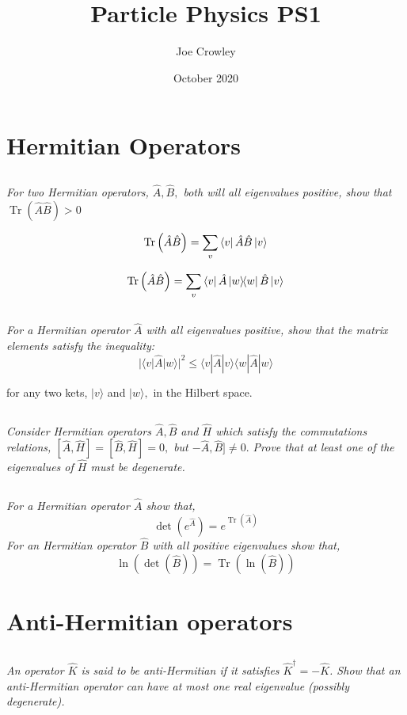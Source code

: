 \documentclass[12pt, letterpaper]{article}
\title{Particle Physics PS1}
\author{Joe Crowley}
\date{October 2020}
\begin{document}
  

\section{Hermitian Operators}
\subsection{}
\textit{For two Hermitian operators, $\hat{A}, \hat{B},$ both will all eigenvalues positive, show that $\operatorname{Tr}(\hat{A} \hat{B})>0$}

$$
\operatorname{Tr}\left(\hat{A}\hat{B}\right) = \sum_v \bra{v}\hat{A}\hat{B}\ket{v}
$$

$$
\operatorname{Tr}\left(\hat{A}\hat{B}\right) = \sum_v \bra{v}\hat{A}\ketbra{w}\hat{B}\ket{v}
$$
\subsection{}
\textit{For a Hermitian operator $\hat{A}$ with all eigenvalues positive, show that the matrix elements satisfy the inequality:}
$$
|\langle v|\hat{A}| w\rangle|^{2} \leq\langle v|\hat{A}| v\rangle\langle w|\hat{A}| w\rangle
$$

for any two kets, $|v\rangle$ and $|w\rangle,$ in the Hilbert space.


\subsection{}
\textit{Consider Hermitian operators $\hat{A}, \hat{B}$ and $\hat{H}$ which satisfy the commutations relations, $[\hat{A}, \hat{H}]=[\hat{B}, \hat{H}]=0,$ but $-\hat{A}, \hat{B}] \neq 0 .$ Prove that at least one of the eigenvalues of $\hat{H}$ must be degenerate.}


\subsection{}
\textit{For a Hermitian operator $\hat{A}$ show that,
$$
\operatorname{det}\left(e^{\hat{A}}\right)=e^{\operatorname{Tr}(\hat{A})}
$$
For an Hermitian operator $\hat{B}$ with all positive eigenvalues show that,
$$
\ln (\operatorname{det}(\hat{B}))=\operatorname{Tr}(\ln (\hat{B}))
$$
}

\section{Anti-Hermitian operators}
\subsection{}
\textit{An operator $\hat{K}$ is said to be anti-Hermitian if it satisfies $\hat{K}^{\dagger}=-\hat{K}$. Show that an anti-Hermitian operator can have at most one real eigenvalue (possibly degenerate).}
\end{document}
